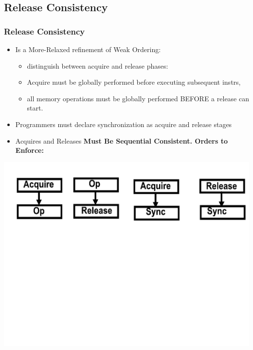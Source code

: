 \documentclass{beamer}
\renewcommand{\emph}[1]{\textcolor{structure}{#1}}
\newcommand{\emp}[1]{\textcolor{DikuRed}{ #1}}
\begin{document}
\subsection{Release Consistency}

\begin{frame}[fragile,t]
\frametitle{Release Consistency}

\begin{itemize}
    \item Is a More-Relaxed refinement of Weak Ordering:
        \begin{itemize}
            \item distinguish between acquire and release phases:
            \item \emp{Acquire} must be globally performed 
                        before executing subsequent instrs,
            \item all memory operations must be globally performed 
                        BEFORE a \emp{release} can start. 
        \end  {itemize}\medskip

    \item Programmers must declare synchronization as 
            \emp{acquire} and \emp{release} stages\medskip

    \item \emp{Acquires and Releases} \emph{\bf Must Be Sequential Consistent. Orders to Enforce:}
\end{itemize}

\includegraphics[width=55ex]{Ch7Figs/ReleasedOrdering}

\end{frame}
\end{document}
